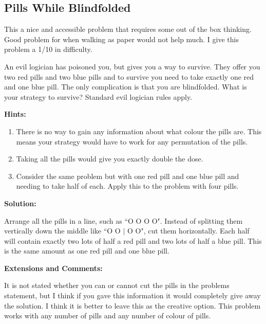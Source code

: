 \subsection{Pills While Blindfolded}

This a nice and accessible problem that requires some out of the box thinking. Good problem for when walking as paper would not help much. I give this problem a 1/10 in difficulty.

An evil logician has poisoned you, but gives you a way to survive. They offer you two red pills and two blue pills and to survive you need to take exactly one red and one blue pill. The only complication is that you are blindfolded. What is your strategy to survive? Standard evil logician rules apply.

\textbf{Hints:}

\begin{enumerate}
	\item There is no way to gain any information about what colour the pills are. This means your strategy would have to work for any permutation of the pills.
	\item Taking all the pills would give you exactly double the dose.
	\item Consider the same problem but with one red pill and one blue pill and needing to take half of each. Apply this to the problem with four pills.
\end{enumerate}

\textbf{Solution:}

Arrange all the pills in a line, such as ``O O O O". Instead of splitting them vertically down the middle like ``O O $|$ O O", cut them horizontally. Each half will contain exactly two lots of half a red pill and two lots of half a blue pill. This is the same amount as one red pill and one blue pill.

\textbf{Extensions and Comments:}

It is not stated whether you can or cannot cut the pills in the problems statement, but I think if you gave this information it would completely give away the solution. I think it is better to leave this as the creative option. This problem works with any number of pills and any number of colour of pills.